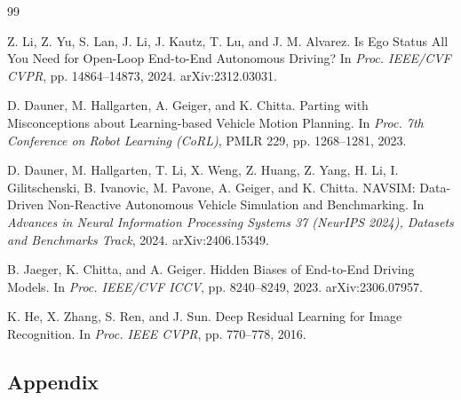 \documentclass[
  english,
  10pt,
]{article}
\begin{document}
\begin{thebibliography}{99}
\begin{otherlanguage}{english}
Z. Li, Z. Yu, S. Lan, J. Li, J. Kautz, T. Lu, and J. M. Alvarez. Is Ego
Status All You Need for Open-Loop End-to-End Autonomous Driving? In
\emph{Proc. IEEE/CVF CVPR}, pp. 14864--14873, 2024. arXiv:2312.03031.

\end{otherlanguage}

\begin{otherlanguage}{english}

D. Dauner, M. Hallgarten, A. Geiger, and K. Chitta. Parting with
Misconceptions about Learning-based Vehicle Motion Planning. In
\emph{Proc. 7th Conference on Robot Learning (CoRL)}, PMLR 229, pp.
1268--1281, 2023.

\end{otherlanguage}

\begin{otherlanguage}{english}

D. Dauner, M. Hallgarten, T. Li, X. Weng, Z. Huang, Z. Yang, H. Li, I.
Gilitschenski, B. Ivanovic, M. Pavone, A. Geiger, and K. Chitta. NAVSIM:
Data-Driven Non-Reactive Autonomous Vehicle Simulation and Benchmarking.
In \emph{Advances in Neural Information Processing Systems 37 (NeurIPS
2024), Datasets and Benchmarks Track}, 2024. arXiv:2406.15349.

\end{otherlanguage}

\begin{otherlanguage}{english}

B. Jaeger, K. Chitta, and A. Geiger. Hidden Biases of End-to-End Driving
Models. In \emph{Proc. IEEE/CVF ICCV}, pp. 8240--8249, 2023.
arXiv:2306.07957.

\end{otherlanguage}

\begin{otherlanguage}{english}

K. He, X. Zhang, S. Ren, and J. Sun. Deep Residual Learning for Image
Recognition. In \emph{Proc. IEEE CVPR}, pp. 770--778, 2016.

\end{otherlanguage}

\end{thebibliography}
\clearpage
\appendix
\subsection{Appendix}\label{appendix}
\end{document}
